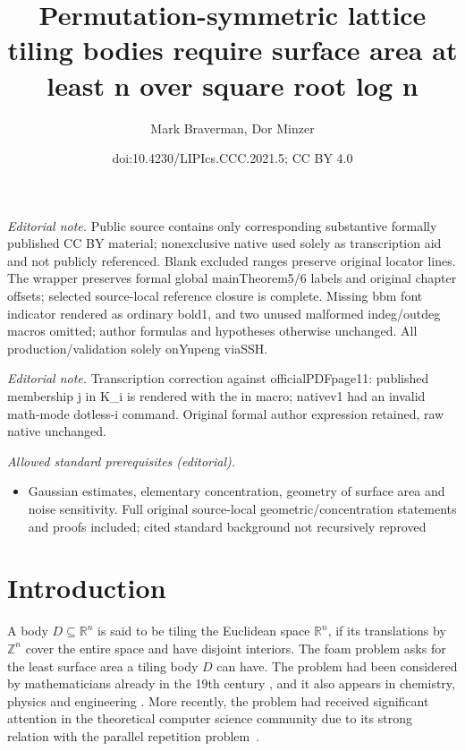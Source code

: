 \documentclass[10pt,a4paper]{article}
\title{Permutation-symmetric lattice tiling bodies require surface area at least n over square root log n}
\author{Mark Braverman, Dor Minzer}
\date{doi:10.4230/LIPIcs.CCC.2021.5; CC BY 4.0}
\begin{document}
\maketitle
\noindent\textit{Editorial note.} Public source contains only corresponding substantive formally published CC BY material; nonexclusive native used solely as transcription aid and not publicly referenced. Blank excluded ranges preserve original locator lines. The wrapper preserves formal global mainTheorem5/6 labels and original chapter offsets; selected source-local reference closure is complete. Missing bbm font indicator rendered as ordinary bold1, and two unused malformed indeg/outdeg macros omitted; author formulas and hypotheses otherwise unchanged. All production/validation solely onYupeng viaSSH.\par\medskip
\noindent\textit{Editorial note.} Transcription correction against officialPDFpage11: published membership j in K\_i is rendered with the in macro; nativev1 had an invalid math-mode dotless-i command. Original formal author expression retained, raw native unchanged.\par\medskip
\noindent\textit{Allowed standard prerequisites (editorial).}\begin{itemize}
\item Gaussian estimates, elementary concentration, geometry of surface area and noise sensitivity. Full original source-local geometric/concentration statements and proofs included; cited standard background not recursively reproved
\end{itemize}\medskip
\section{Introduction}

A body $D\subseteq\mathbb{R}^n$ is said to be tiling the Euclidean space $\mathbb{R}^n$, if its translations by $\mathbb{Z}^n$
cover the entire space and have disjoint interiors. The foam problem asks for the least surface area a tiling body
$D$ can have. The problem had been considered by mathematicians already in the 19th century \cite{Thomson87},
and it also appears in chemistry, physics and engineering \cite{chemistry}. More recently, the problem had received
significant attention in the theoretical computer science community due to its strong relation with the parallel repetition problem~\cite{FKO,KROW,AK}.
\end{document}
